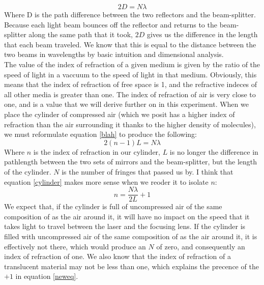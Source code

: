 \documentclass{amsart}
\begin{document}
\begin{equation}
    2D = N\lambda
\end{equation}
Where D is the path difference between the two reflectors and the beam-splitter. Because each light beam bounces off the reflector and returns to the beam-splitter along the same path that it took, $2D$ gives us the difference in the length that each beam traveled. We know that this is equal to the distance between the two beams in wavelengths by basic intuition and dimensional analysis.
\\
The value of the index of refraction of a given medium is given by the ratio of the speed of light in a vaccuum to the speed of light in that medium. Obviously, this means that the index of refraction of free space is 1, and the refractive indeces of all other media is greater than one. The index of refraction of air is very close to one, and is a value that we will derive further on in this experiment.
When we place the cylinder of compressed air (which we posit has a higher index of refraction than the air surrounding it thanks to the higher density of molecules), we must reformulate equation \ref{blah} to produce the following:
\begin{equation}
    \label{cylinder}
    2(n-1)L = N\lambda
\end{equation}
Where $n$ is the index of refraction in our cylinder, $L$ is no longer the difference in pathlength between the two sets of mirrors and the beam-splitter, but the length of the cylinder. $N$ is the number of fringes that passed us by. I think that equation \ref{cylinder} makes more sense when we reoder it to isolate $n$:
\begin{equation}
    \label{neweq}
    n = \dfrac{N\lambda}{2L} + 1
\end{equation}
We expect that, if the cylinder is full of uncompressed air of the same composition of as the air around it, it will have no impact on the speed that it takes light to travel between the laser and the focusing lens. If the cylinder is filled with uncompressed air of the same composition of as the air around it, it is effectively not there, which would produce an $N$ of zero, and consequently an index of refraction of one. We also know that the index of refraction of a translucent material may not be less than one, which explains the precence of the $+1$ in equation \ref{neweq}.
\end{document}
